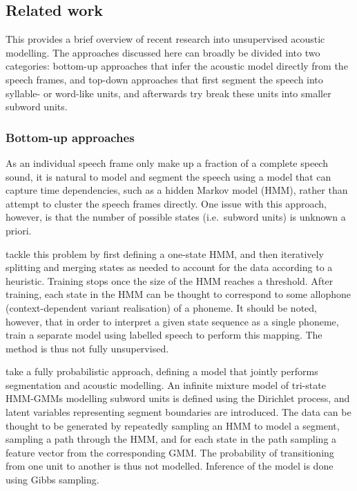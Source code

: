 \subsection{Related work}

This  provides a brief overview of recent research into unsupervised acoustic modelling.
The approaches discussed here can broadly be divided into two categories: bottom-up approaches that infer the acoustic model directly from the speech frames, and top-down approaches that first segment the speech into syllable- or word-like units, and afterwards try break these units into smaller subword units.

\subsubsection{Bottom-up approaches}

As an individual speech frame only make up a fraction of a complete speech sound, it is natural to model and segment the speech using a model that can capture time dependencies, such as a hidden Markov model (HMM), rather than attempt to cluster the speech frames directly.
One issue with this approach, however, is that the number of possible states (i.e.\ subword units) is unknown a priori.

\textcite{varadarajan2008unsupervised} tackle this problem by first defining a one-state HMM, and then iteratively splitting and merging states as needed to account for the data according to a heuristic.
Training stops once the size of the HMM reaches a threshold.
After training, each state in the HMM can be thought to correspond to some allophone (context-dependent variant realisation) of a phoneme.
It should be noted, however, that in order to interpret a given state sequence as a single phoneme, \citeauthor{varadarajan2008unsupervised} train a separate model using labelled speech to perform this mapping.
The method is thus not fully unsupervised.

\textcite{lee2012nonparametric} take a fully probabilistic approach, defining a model that jointly performs segmentation and acoustic modelling.
An infinite mixture model of tri-state HMM-GMMs modelling subword units is defined using the Dirichlet process, and latent variables representing segment boundaries are introduced.
The data can be thought to be generated by repeatedly sampling an HMM to model a segment, sampling a path through the HMM, and for each state in the path sampling a feature vector from the corresponding GMM.
The probability of transitioning from one unit to another is thus not modelled.
Inference of the model is done using Gibbs sampling.

